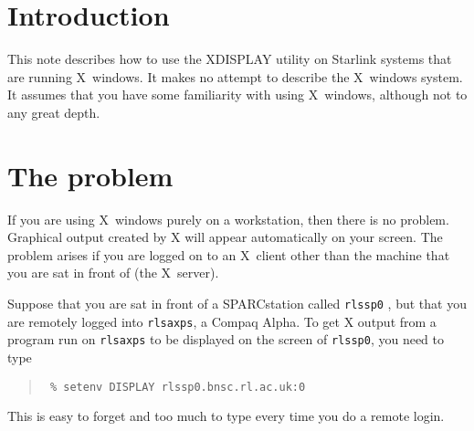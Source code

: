 \documentclass[twoside,11pt]{article}
\newcommand{\stardocinitials}  {SUN}
\newcommand{\stardocnumber}    {129.5}
\newcommand{\stardocname}{\stardocinitials /\stardocnumber}
\newenvironment{latexonly}{}{}
\newcommand{\xlabel}[1]{}
\renewcommand{\_}{\texttt{\symbol{95}}}
\renewcommand{\thepage}{\roman{page}}
\begin{document}
\renewcommand{\thepage}{\arabic{page}}
\setcounter{page}{1}


\section{\label{intro}\xlabel{intro}Introduction}

This note describes how to use the XDISPLAY utility on Starlink systems
that are running X~windows.  It makes no attempt to describe the
X~windows system.  It assumes that you have some familiarity with using
X~windows, although not to any great depth.

\section{\label{problem}\xlabel{problem}The problem}

If you are using X~windows purely on a workstation, then there is no
problem.  Graphical output created by X will appear automatically on
your screen.  The problem arises if you are logged on to an X~client
other than the machine that you are sat in front of (the X~server).

Suppose that you are sat in front of a SPARCstation called \texttt{rlssp0}
, but that you are remotely logged into \texttt{rlsaxps}, a Compaq
Alpha.  To get X output from a program run on \texttt{rlsaxps} to be
displayed on the screen of \texttt{rlssp0}, you need to type

\begin{quote}\texttt{
\% setenv DISPLAY rlssp0.bnsc.rl.ac.uk:0
}
\end{quote}

This is easy to forget and too much to type every time you do a remote
login.  
\end{document}
